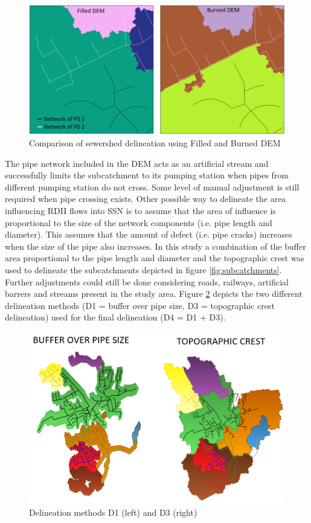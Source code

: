\begin{figure}[h]
    \centering
	\includegraphics[scale=0.6]{figures/burnedxfilledDEM.png}
	\caption{Comparison of sewershed delineation using Filled and Burned DEM}
	\label{fig:filledxburned}
\end{figure}


The pipe network included in the DEM acts as an artificial stream and successfully limits the subcatchment to its pumping station when pipes from different pumping station do not cross. Some level of manual adjustment is still required when pipe crossing exists.
Other possible way to delineate the area influencing RDII flows into \ac{SSN} is to assume that the area of influence is proportional to the size of the network components (i.e. pipe length and diameter). This assumes that the amount of defect (i.e. pipe cracks) increases when the size of the pipe also increases. In this study a combination of the buffer area proportional to the pipe length and diameter and the topographic crest was used to delineate the subcatchments depicted in figure \ref{fig:subcatchments}. Further adjustments could still be done considering roads, railways, artificial barrers and streams present in the study area. Figure \ref{fig:d1d3} depicts the two different delineation methods (D1 = buffer over pipe size, D3 = topographic crest delineation) used for the final delineation (D4 = D1 + D3).

\begin{figure}[h]
    \centering
	\includegraphics[scale=0.6]{figures/d1_plus_d3.png}
	\caption{Delineation methods D1 (left) and D3 (right)}
	\label{fig:d1d3}
\end{figure}

